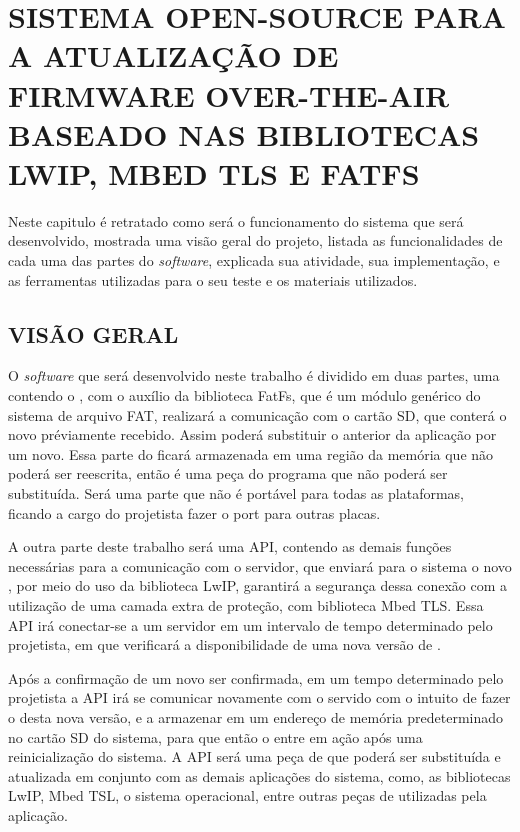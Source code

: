 
\chapter{SISTEMA OPEN-SOURCE PARA A ATUALIZAÇÃO DE FIRMWARE OVER-THE-AIR BASEADO NAS BIBLIOTECAS LWIP, MBED TLS E FATFS}
\label{chap:metodologia}
Neste capitulo é retratado como será o funcionamento do sistema que será desenvolvido, mostrada uma visão geral do projeto, listada as funcionalidades de cada uma das partes do \textit{software}, explicada sua atividade, sua implementação, e as ferramentas utilizadas para o seu teste e os materiais utilizados. 

\section{VISÃO GERAL}
O \textit{software} que será desenvolvido neste trabalho é dividido em duas partes, uma contendo o \bootloader, com o auxílio da biblioteca FatFs, que é um módulo genérico do sistema de arquivo FAT, realizará a comunicação com o cartão SD, que conterá o novo \firmware préviamente recebido. Assim poderá substituir o \software anterior da aplicação por um novo. Essa parte do \software ficará armazenada em uma região da memória que não poderá ser reescrita, então é uma peça do programa que não poderá ser substituída. Será uma parte que não é portável para todas as plataformas, ficando a cargo do projetista fazer o port para outras placas.

A outra parte deste trabalho será uma API, contendo as demais funções necessárias para a comunicação com o servidor, que enviará para o sistema o novo \firmware, por meio do uso da biblioteca LwIP, garantirá a segurança dessa conexão com a utilização de uma camada extra de proteção, com biblioteca Mbed TLS. Essa API irá conectar-se a um servidor em um intervalo de tempo determinado pelo projetista, em que verificará a disponibilidade de uma nova versão de \software. 

Após a confirmação de um novo \firmware ser confirmada, em um tempo determinado pelo projetista a API irá se comunicar novamente com o servido com o intuito de fazer o \download desta nova versão, e a armazenar em um endereço de memória predeterminado no cartão SD do sistema, para que então o \bootloader entre em ação após uma reinicialização do sistema.
A API será uma peça de \software que poderá ser substituída e atualizada em conjunto com as demais aplicações do sistema, como, as bibliotecas LwIP, Mbed TSL, o sistema operacional, entre outras peças de \software utilizadas pela aplicação. 

